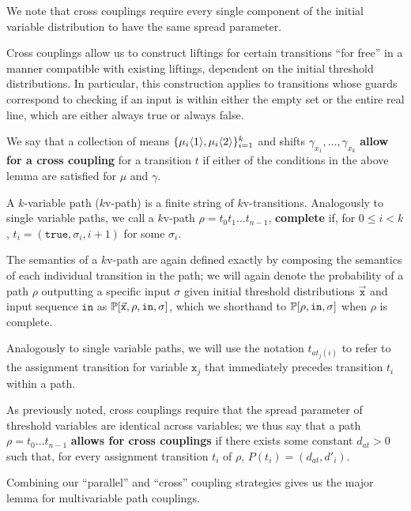 We note that cross couplings require every single component of the initial variable distribution to have the same spread parameter.

Cross couplings allow us to construct liftings for certain transitions ``for free'' in a manner compatible with existing liftings, dependent on the initial threshold distributions. In particular, this construction applies to transitions whose guards correspond to checking if an input is within either the empty set or the entire real line, which are either always true or always false. 

We say that a collection of means $\{\mu_i\langle1 \rangle, \mu_i\langle2 \rangle\}_{i=1}^k$ and shifts $\gamma_{x_1},\ldots,\gamma_{x_k}$ \textbf{allow for a cross coupling} for a transition $t$ if either of the conditions in the above lemma are satisfied for $\mu$ and $\gamma$. 

\begin{defn}
    A $k$-variable path ($k$v-path) is a finite string of $k$v-transitions. Analogously to single variable paths, we call a $k$v-path $\rho = t_0t_1\ldots t_{n-1}$, \textbf{complete} if, for $0\leq i < k$, $t_i = (\texttt{true}, \sigma_i, i+1)$ for some $\sigma_i$.
\end{defn}

The semantics of a $k$v-path are again defined exactly by composing the semantics of each individual transition in the path; we will again denote the probability of a path $\rho$ outputting a specific input $\sigma$ given initial threshold distributions $\vec{\texttt{x}}$ and input sequence $\texttt{in}$ as $\mathbb{P}[\vec{\texttt{x}}, \rho, \texttt{in}, \sigma]$, which we shorthand to $\mathbb{P}[\rho, \texttt{in}, \sigma]$ when $\rho$ is complete.

Analogously to single variable paths, we will use the notation $t_{at_j(i)}$ to refer to the assignment transition for variable $\texttt{x}_j$ that immediately precedes transition $t_i$ within a path. 

As previously noted, cross couplings require that the spread parameter of threshold variables are identical across variables; we thus say that a path $\rho = t_0\ldots t_{n-1}$ \textbf{allows for cross couplings} if there exists some constant $d_{at}>0$ such that, for every assignment transition $t_i$ of $\rho$, $P(t_i) = (d_{at}, d'_i)$. 


Combining our ``parallel'' and ``cross'' coupling strategies gives us the major lemma for multivariable path couplings.

